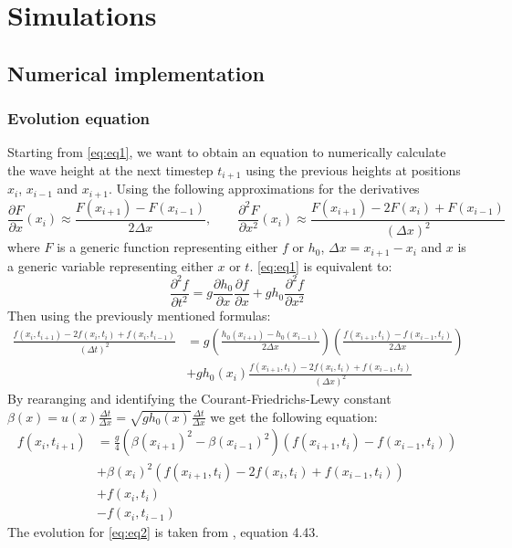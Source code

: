 \section{Simulations}

\subsection{Numerical implementation}

\subsubsection{Evolution equation}

Starting from \autoref{eq:eq1}, we want to obtain an equation to numerically calculate the wave height at the next timestep \(t_{i+1}\) using the previous heights at positions \(x_i\), \(x_{i-1}\) and \(x_{i+1}\). Using the following approximations for the derivatives
\begin{equation}
    \frac{\partial F}{\partial x}(x_i) \approx \frac{F(x_{i+1}) - F(x_{i-1})}{2 \Delta x}
    , \qquad
    \frac{\partial^2 F}{\partial x^2}(x_i) \approx \frac{F(x_{i+1}) - 2 F(x_i) + F(x_{i-1})}{(\Delta x)^2}
\end{equation}
where \(F\) is a generic function representing either \(f\) or \(h_0\), \(\Delta x = x_{i+1} - x_i\) and \(x\) is a generic variable representing either \(x\) or \(t\). \autoref{eq:eq1} is equivalent to:
\begin{equation}
    \frac{\partial^2 f}{\partial t^2} = g \frac{\partial h_0}{\partial x} \frac{\partial f}{\partial x} + g h_0 \frac{\partial^2 f}{\partial x^2}
\end{equation}
Then using the previously mentioned formulas:
\begin{equation}
    \begin{aligned}
        \frac{f(x_i, t_{i+1}) - 2 f(x_i, t_i) + f(x_i, t_{i-1})}{(\Delta t)^2} &= g \left( \frac{h_0(x_{i+1}) - h_0(x_{i-1})}{2 \Delta x} \right) \left( \frac{f(x_{i+1}, t_i) - f(x_{i-1}, t_i)}{2 \Delta x} \right) \\
        &+ g h_0(x_i) \frac{f(x_{i+1}, t_i) - 2 f(x_i, t_i) + f(x_{i-1}, t_i)}{(\Delta x)^2}
    \end{aligned}
\end{equation}
By rearanging and identifying the Courant-Friedrichs-Lewy constant \(\beta(x) = u(x) \frac{\Delta t}{\Delta x} = \sqrt{g h_0(x)} \frac{\Delta t}{\Delta x}\) we get the following equation:
\begin{equation}
    \begin{aligned}
        f(x_i, t_{i+1}) &= \frac{g}{4} \left( \beta(x_{i+1})^2 - \beta(x_{i-1})^2 \right) \left( f(x_{i+1}, t_i) - f(x_{i-1}, t_i) \right) \\
        &+ \beta(x_i)^2 (f(x_{i+1}, t_i) - 2 f(x_i, t_i) + f(x_{i-1}, t_i)) \\
        &+ f(x_i,t_i) \\
        &- f(x_i,t_{i-1})
    \end{aligned}
\end{equation}
The evolution for \autoref{eq:eq2} is taken from \cite{physnumbook}, equation 4.43.

